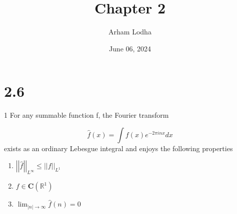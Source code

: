 \documentclass{article}
\newcommand{\h}[1]{\hat{#1}}
\newcommand{\R}{\mathbb{R}}
\newcommand{\abs}[1]{\left\lvert #1\right\rvert}
\newcommand{\aabs}[1]{\left\lvert \left\lvert #1 \right\rvert\right\rvert}
\begin{document}
\title{Chapter 2}
\author{Arham Lodha}%
\date{June 06, 2024}%
\maketitle

\section*{2.6}
\begin{claim}{1}\label{Claim 1.}
    For any summable function f, the Fourier transform 

    \begin{equation*}
        \h{f}(x) = \int f(x) e^{-2 \pi i n x} dx
    \end{equation*}
    exists as an ordinary Lebesgue integral and enjoys the following properties

    \begin{enumerate}
        \item $\aabs{\h{f}}_{L^{\infty}} \leq \aabs{f}_{L^{1}}$
        \item $f \in \mathbf{C}(\R^1)$
        \item $\lim_{\abs{n} \to \infty} \h{f}(n) = 0$  
    \end{enumerate}
    
\end{claim}
\end{document}

